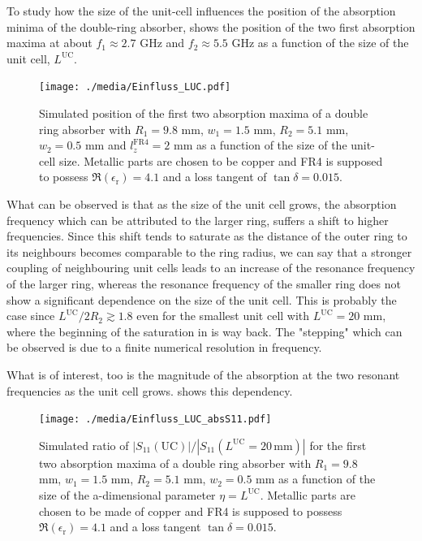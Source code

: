 To study how the size of the unit-cell influences the position of the absorption 
minima of the double-ring absorber,  shows the position of the two first absorption maxima at about $f_1\approx2.7$ GHz and $f_2\approx 5.5$ GHz as a function of the size of the unit cell, $L^\text{UC}$.
\begin{figure}
\centering
\texttt{[image: ./media/Einfluss\_LUC.pdf]}
\caption{Simulated position of the first two absorption maxima of a double ring absorber with $R_1=9.8$ mm, $w_1=1.5$ mm, $R_2=5.1$ mm, $w_2=0.5$ mm and $l_z^\mathrm{FR4}=2$ mm as a function of the size of the unit-cell size. Metallic parts are chosen to be copper and FR4 is supposed to possess $\Re\left(\epsilon_\mathrm{r}\right)=4.1$ and a loss tangent of $\tan\delta = 0.015$.}
\label{fig:LUC}
\end{figure}

What can be observed is that as the size of the unit cell grows, the absorption frequency which can be attributed to the larger ring, suffers a shift to higher frequencies. Since this shift tends to saturate as the distance of the outer ring to its neighbours becomes comparable to the ring radius, we can say that a stronger coupling of neighbouring unit cells leads to an increase of the resonance frequency of the larger ring, whereas the resonance frequency of the smaller ring does not show a significant dependence on the size of the unit cell. This is probably the case since $L^\mathrm{UC}/2 R_2\gtrsim 1.8$ even for the smallest unit cell with $L^\mathrm{UC}=20$ mm, where the beginning of the saturation in  is way back. The "stepping" which can be observed is due to a finite numerical resolution in frequency.

What is of interest, too is the magnitude of the absorption at the two resonant frequencies as the unit cell grows.  shows this dependency.

\begin{figure}
\centering
\texttt{[image: ./media/Einfluss\_LUC\_absS11.pdf]}
\caption{Simulated ratio of $|S_{11}(\mathrm{UC})|/|S_{11}(L^\mathrm{UC}=20\,\mathrm{mm})|$ for the first two absorption maxima of a double ring absorber with $R_1=9.8$ mm, $w_1=1.5$ mm, $R_2=5.1$ mm, $w_2=0.5$ mm as a function of the size of the a-dimensional parameter $\eta = L^\mathrm{UC}$. Metallic parts are chosen to be made of copper and FR4 is supposed to possess $\Re\left(\epsilon_\mathrm{r}\right)=4.1$ and a loss tangent $\tan\delta = 0.015$.}
\label{fig:LUC_absS11}
\end{figure}


